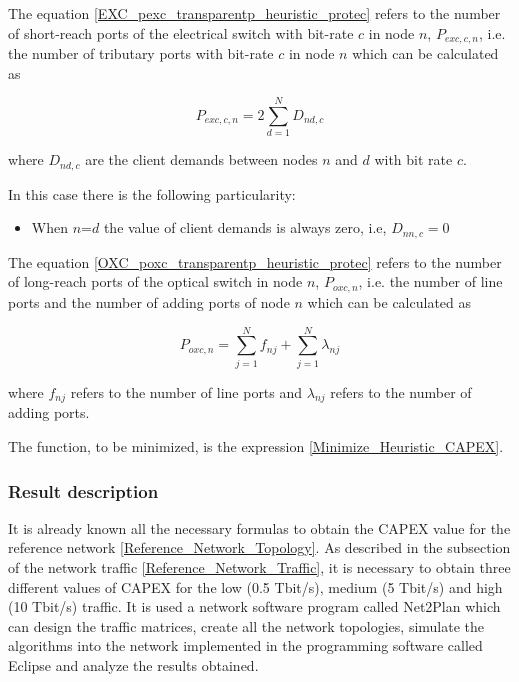 The equation \ref{EXC_pexc_transparentp_heuristic_protec} refers to the number of short-reach ports of the electrical switch with bit-rate $c$ in node $n$, $P_{exc,c,n}$, i.e. the number of tributary ports with bit-rate $c$ in node $n$ which can be calculated as

\begin{equation}
P_{exc,c,n} = 2 \sum_{d=1}^{N} D_{nd,c}
\label{EXC_pexc_transparentp_heuristic_protec}
\end{equation}

\vspace{11pt}
where $D_{nd,c}$ are the client demands between nodes $n$ and $d$ with bit rate $c$.

\vspace{11pt}
In this case there is the following particularity:

\begin{itemize}
  \item When $n$=$d$ the value of client demands is always zero, i.e, $D_{nn,c}=0$
\end{itemize}

\vspace{11pt}
The equation \ref{OXC_poxc_transparentp_heuristic_protec} refers to the number of long-reach ports of the optical switch in node $n$, $P_{oxc,n}$, i.e. the number of line ports and the number of adding ports of node $n$ which can be calculated as

\begin{equation}
P_{oxc,n} = \sum_{j=1}^{N} f_{nj} + \sum_{j=1}^{N} \lambda_{nj}
\label{OXC_poxc_transparentp_heuristic_protec}
\end{equation}

\vspace{11pt}
where $f_{nj}$ refers to the number of line ports and $\lambda_{nj}$ refers to the number of adding ports.

\vspace{17pt}
The function, to be minimized, is the expression \ref{Minimize_Heuristic_CAPEX}.\\

\subsubsection{Result description}

It is already known all the necessary formulas to obtain the CAPEX value for the reference network \ref{Reference_Network_Topology}. As described in the subsection of the network traffic \ref{Reference_Network_Traffic}, it is necessary to obtain three different values of CAPEX for the low (0.5 Tbit/s), medium (5 Tbit/s) and high (10 Tbit/s) traffic. It is used a network software program called Net2Plan which can design the traffic matrices, create all the network topologies, simulate the algorithms into the network implemented in the programming software called Eclipse and analyze the results obtained.

